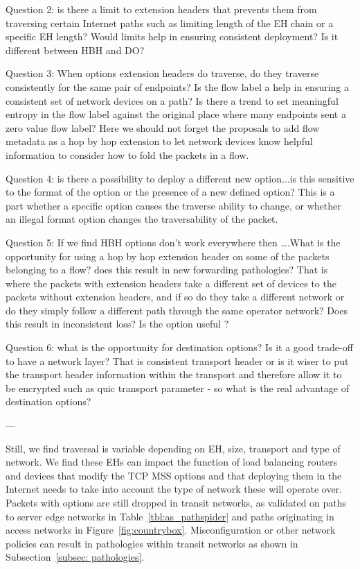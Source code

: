 \documentclass[conference]{IEEEtran}
\begin{document}
Question 2: is there a limit to extension headers that prevents them from traversing certain Internet paths such as limiting length of the EH chain or a specific EH length? Would limits help in ensuring consistent deployment? Is it different between HBH and DO?


Question 3: When options extension headers do traverse, do they traverse consistently for the same pair of endpoints? Is the flow label a help in ensuring a consistent set of network devices on a path?
Is there a trend to set meaningful entropy in the flow label against the original place where many endpoints sent a zero value flow label?
Here we should not forget the proposals to add flow metadata as a hop by hop extension to let network devices know helpful information to consider how to fold the packets in a flow.


Question 4: is there a possibility to deploy a different new option...is this sensitive to the format of the option or the presence of a new defined option? This is a part whether a specific option causes the traverse ability to change, or whether an illegal format option changes the traversability of the packet.


Question 5: If we find HBH options don’t work everywhere then ….What is the opportunity for using a hop by hop extension header on some of the packets belonging to a flow? does this result in new forwarding pathologies? That is where the packets with extension headers take a different set of devices to the packets without extension headers, and if so do they take a different network or do they simply follow a different path through the same operator network? Does this result in inconsistent loss? Is the option useful ?


Question 6: what is the opportunity for destination options? Is it a good trade-off to have a network layer? That is consistent transport header or is it wiser to put the transport header information within the transport and therefore allow it to be encrypted such as quic transport parameter - so what is the real advantage of destination options?

---



Still, we find traversal is variable depending on EH, size, transport and type of network. We find these EHs can impact the function of load balancing routers and devices that modify the TCP MSS options and that deploying them in the Internet needs to take into account the type of network these will operate over.
Packets with options are still dropped in transit networks, as validated on paths to server edge networks in Table~\ref{tbl:as_pathspider} and paths originating in access networks in Figure~\ref{fig:countrybox}. Misconfiguration or other network policies can result in pathologies within transit networks as shown in Subsection~\ref{subsec: pathologies}.
\end{document}
